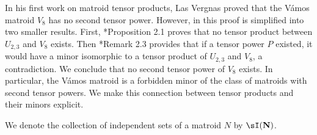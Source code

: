     In his first work on matroid tensor products, Las Vergnas proved that the V\'amos matroid $V_8$ has no second tensor power. However, in \cite{LV81} this proof is simplified into two smaller results. First, \cite{LV81}*{Proposition 2.1} proves that no tensor product between $U_{2,3}$ and $V_8$ exists. Then \cite{LV81}*{Remark 2.3} provides that if a tensor power $P$ existed, it would have a minor isomorphic to a tensor product of $U_{2,3}$ and $V_8$, a contradiction. We conclude that no second tensor power of $V_8$ exists. In particular, the V\'amos matroid is a forbidden minor of the class of matroids with second tensor powers. We make this connection between tensor products and their minors explicit.

    We denote the collection of independent sets of a matroid $N$ by $\mathbf{\sI(N)}$.

